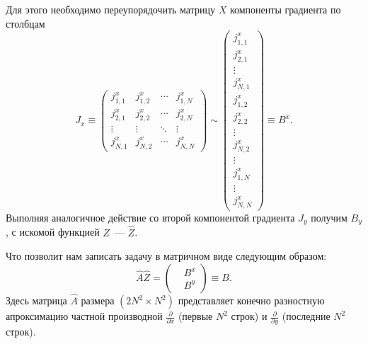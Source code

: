\documentclass{beamer}
\begin{document}
\begin{frame}[c,allowframebreaks]
    Для этого необходимо переупорядочить матрицу $X$ компоненты градиента по столбцам
    \begin{equation}
        \label{column-major_ordering}
        J_x \equiv
        \left(
            \begin{array}{cccc}
                j^x_{1,1} & j^x_{1,2} & \cdots & j^x_{1,N} \\
                j^x_{2,1} & j^x_{2,2} & \cdots & j^x_{2,N} \\
                \vdots & \vdots & \ddots & \vdots  \\
                j^x_{N,1} & j^x_{N,2} & \cdots & j^x_{N,N}
            \end{array}
        \right)
        \sim
        \left(
            \begin{array}{c}
                j^x_{1,1} \\
                j^x_{2,1} \\
                \vdots \\
                j^x_{N,1} \\
                j^x_{1,2} \\
                j^x_{2,2} \\
                \vdots \\
                j^x_{N,2} \\
                \vdots \\
                j^x_{1,N} \\
                \vdots \\
                j^x_{N,N}
            \end{array}
        \right)
        \equiv{}  B^x.
    \end{equation}
    Выполняя аналогичное действие со второй компонентой градиента $J_y$ получим $B_y$, с искомой
    функцией $Z$~--- $\hat{Z}$.


    Что позволит нам записать задачу в матричном виде следующим образом:
    \begin{equation*}
        \label{matrix_equation}
        \hat{A} \hat{Z}  =
        \left(
        \begin{aligned}
            &B^x\\
            &B^y
        \end{aligned}
        \right)
        \equiv B.
    \end{equation*}
    Здесь матрица $\hat{A}$ размера $(2N^2 \times N^2)$ представляет конечно разностную апроксимацию
    частной производной $\frac{\partial}{\partial x}$ (первые $N^2$ строк) и
    $\frac{\partial}{\partial y}$ (последние $N^2$ строк).


\end{frame}
\end{document}
